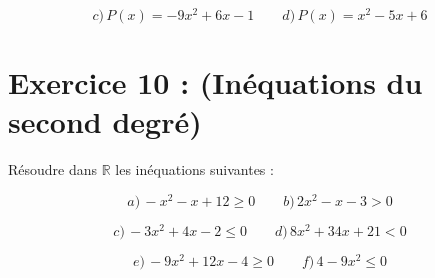 \documentclass[12pt]{article}
\begin{document}
\[
c) \, P(x) = -9x^2 + 6x - 1 \quad\quad d) \, P(x) = x^2 - 5x + 6
\]

\section*{Exercice 10 : (Inéquations du second degré)}

Résoudre dans \(\mathbb{R}\) les inéquations suivantes :

\[
a) \, -x^2 - x + 12 \geq 0 \quad\quad b) \, 2x^2 - x - 3 > 0
\]

\[
c) \, -3x^2 + 4x - 2 \leq 0 \quad\quad d) \, 8x^2 + 34x + 21 < 0
\]

\[
e) \, -9x^2 + 12x - 4 \geq 0 \quad\quad f) \, 4 - 9x^2 \leq 0
\]
\end{document}
